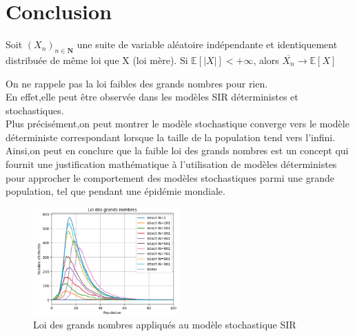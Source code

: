 \chapter{Conclusion}

\begin{theorem}
 Soit $(X_n)_{n \in \boldsymbol{N}}$ une suite de variable aléatoire indépendante et identiquement distribuée de même loi que X (loi mère). Si $\mathbb{E}[|X|] < +\infty$, alors $\overline{X_n} \rightarrow \mathbb{E}[X]$
\end{theorem}


On ne rappele pas la loi faibles des grands nombres pour rien.\\
En effet,elle peut être observée dans les modèles SIR déterministes et stochastiques.\\
Plus précisément,on peut montrer le modèle stochastique converge vers le modèle déterministe correspondant lorsque la taille de la population tend vers l'infini. Ainsi,on peut en conclure que la faible loi des grands nombres est un concept qui fournit une justification mathématique à l'utilisation de modèles déterministes pour approcher le comportement des modèles stochastiques parmi une grande population, tel que pendant une épidémie mondiale.

\begin{figure}[h]
\centering
\includegraphics[width=0.5\textwidth]{figs/sir_loi_grands_nombres.png}
\caption{Loi des grands nombres appliqués au modèle stochastique SIR}
\label{fig:loi_grands_nombres}
\end{figure}